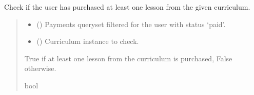 \documentclass[letterpaper,10pt,english]{sphinxmanual}
\begin{document}
\begin{fulllineitems}
\label{\detokenize{cart:cart.views.has_purchased_lessons_of_curriculum}}
\pysigstartsignatures
\pysiglinewithargsret
{}
{\sphinxparamcomma {}}
{}
\pysigstopsignatures
\sphinxAtStartPar
Check if the user has purchased at least one lesson from the given curriculum.
\begin{quote}\begin{description}
\begin{itemize}
\item {} 
\sphinxAtStartPar
{} () \textendash{} Payments queryset filtered for the user with status ‘paid’.

\item {} 
\sphinxAtStartPar
{} ({\hyperref[\detokenize{courses:courses.models.Curriculum}]{}}) \textendash{} Curriculum instance to check.

\end{itemize}

\sphinxAtStartPar
True if at least one lesson from the curriculum is purchased, False otherwise.

\sphinxAtStartPar
bool

\end{description}\end{quote}

\end{fulllineitems}

\end{document}
